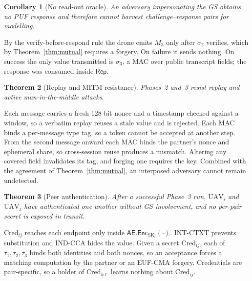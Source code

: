 \documentclass[conference]{IEEEtran}
\newtheorem{theorem}{Theorem}
\newtheorem{corollary}[theorem]{Corollary}
\begin{document}
\begin{corollary}[No read-out oracle]
\label{cor:oracle}
An adversary impersonating the GS obtains no PUF response and therefore cannot
harvest challenge--response pairs for modelling.
\end{corollary}

\begin{IEEEproof}
By the verify-before-respond rule the drone emits $M_3$ only after $\sigma_2$
verifies, which by Theorem~\ref{thm:mutual} requires a forgery. On failure it
sends nothing. On success the only value transmitted is $\sigma_3$, a MAC over
public transcript fields; the response was consumed inside $\mathsf{Rep}$.
\end{IEEEproof}

\begin{theorem}[Replay and MITM resistance]
\label{thm:replay}
Phases~2 and~3 resist replay and active man-in-the-middle attacks.
\end{theorem}

\begin{IEEEproof}
Each message carries a fresh 128-bit nonce and a timestamp checked against a
window, so a verbatim replay reuses a stale value and is rejected. Each MAC
binds a per-message type tag, so a token cannot be accepted at another step.
From the second message onward each MAC binds the partner's nonce and ephemeral
share, so cross-session reuse produces a mismatch. Altering any covered field
invalidates its tag, and forging one requires the key. Combined with the
agreement of Theorem~\ref{thm:mutual}, an interposed adversary cannot remain
undetected.
\end{IEEEproof}

\begin{theorem}[Peer authentication]
\label{thm:peer}
After a successful Phase~3 run, $\text{UAV}_i$ and $\text{UAV}_j$ have
authenticated one another without GS involvement, and no per-pair secret is
exposed in transit.
\end{theorem}

\begin{IEEEproof}
$\text{Cred}_{ij}$ reaches each endpoint only inside
$\mathsf{AE}.\mathsf{Enc}_{\text{SK}_i}(\cdot)$. INT-CTXT prevents substitution
and IND-CCA hides the value. Given a secret $\text{Cred}_{ij}$, each of
$\tau_1,\tau_2,\tau_3$ binds both identities and both nonces, so an acceptance
forces a matching computation by the partner or an EUF-CMA forgery. Credentials
are pair-specific, so a holder of $\text{Cred}_{k\ell}$ learns nothing about
$\text{Cred}_{ij}$.
\end{IEEEproof}
\end{document}
